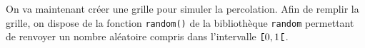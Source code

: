 %
%
%
%
%
%





On va maintenant créer une grille pour simuler la percolation. 
Afin de remplir la grille, on dispose de la fonction \lstinline{random()} de la bibliothèque \lstinline{random} permettant de renvoyer un nombre aléatoire compris dans l'intervalle $\verb![!0,1\verb![!$. 



